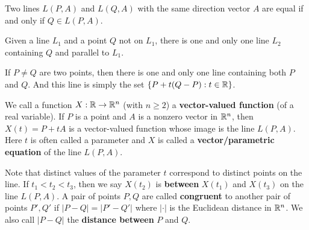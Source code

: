     \begin{theoremenv}
        Two lines $L(P,A)$ and $L(Q,A)$ with the same direction vector $A$ are equal if and only if $Q\in L(P,A)$.
    \end{theoremenv}
    \begin{theoremenv}
        Given a line $L_1$ and a point $Q$ not on $L_1$, there is one and only one line $L_2$ containing $Q$ and parallel to $L_1$.
    \end{theoremenv}
    \begin{theoremenv}
        If $P\neq Q$ are two points, then there is one and only one line containing both $P$ and $Q$. And this line is simply the set $\{ P+t(Q-P) : t\in \mathbb{R}\}$.
    \end{theoremenv}
    \begin{theoremenv}
        We call a function $X: \mathbb{R} \to \mathbb{R}^n$ (with $n\ge 2$) a \textbf{vector-valued function} (of a real variable). If $P$ is a point and $A$ is a nonzero vector in $\mathbb{R}^n$, then $X(t) = P+tA$ is a vector-valued function whose image is the line $L(P,A)$. Here $t$ is often called a parameter and $X$ is called a \textbf{vector/parametric equation} of the line $L(P,A)$.
    \end{theoremenv}
    \begin{definitionenv}
        Note that distinct values of the parameter $t$ correspond to distinct points on the line. If $t_1<t_2<t_3$, then we say $X(t_2)$ is \textbf{between} $X(t_1)$ and $X(t_3)$ on the line $L(P,A)$. A pair of points $P,Q$ are called \textbf{congruent} to another pair of points $P',Q'$ if $|P-Q| = |P'-Q'|$ where $|\cdot|$ is the Euclidean distance in $\mathbb{R}^n$. We also call $|P-Q|$ the \textbf{distance between} $P$ and $Q$.
    \end{definitionenv}
